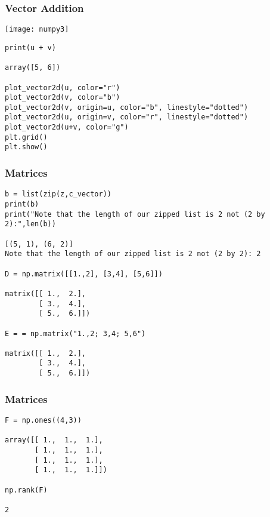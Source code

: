  \begin{frame}[fragile] \frametitle{Vector Addition}

\begin{center}
\texttt{[image: numpy3]}
\end{center}

\begin{lstlisting}
print(u + v)

array([5, 6])

plot_vector2d(u, color="r")
plot_vector2d(v, color="b")
plot_vector2d(v, origin=u, color="b", linestyle="dotted")
plot_vector2d(u, origin=v, color="r", linestyle="dotted")
plot_vector2d(u+v, color="g")
plt.grid()
plt.show()
\end{lstlisting}



\end{frame}

 \begin{frame}[fragile] \frametitle{Matrices}

\begin{lstlisting}
b = list(zip(z,c_vector))
print(b)
print("Note that the length of our zipped list is 2 not (2 by 2):",len(b))

[(5, 1), (6, 2)]
Note that the length of our zipped list is 2 not (2 by 2): 2

D = np.matrix([[1.,2], [3,4], [5,6]])

matrix([[ 1.,  2.],
        [ 3.,  4.],
        [ 5.,  6.]])
				
E = = np.matrix("1.,2; 3,4; 5,6")

matrix([[ 1.,  2.],
        [ 3.,  4.],
        [ 5.,  6.]])
\end{lstlisting}

\end{frame}

 \begin{frame}[fragile] \frametitle{Matrices}

\begin{lstlisting}
F = np.ones((4,3))

array([[ 1.,  1.,  1.],
       [ 1.,  1.,  1.],
       [ 1.,  1.,  1.],
       [ 1.,  1.,  1.]])

np.rank(F)

2

\end{lstlisting}

\end{frame}


